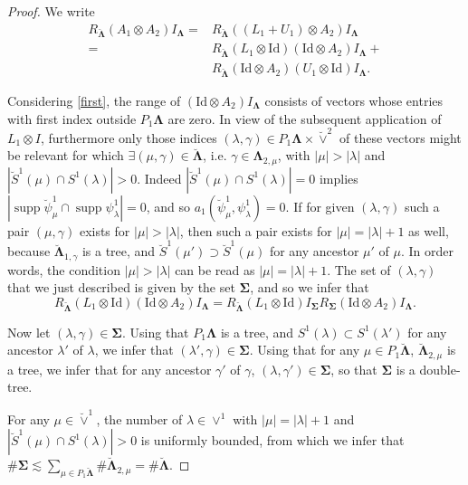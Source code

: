 \documentclass{amsart}
\theoremstyle{definition}
\theoremstyle{remark}
\numberwithin{equation}{section}
\DeclareMathOperator{\supp}{supp}
\newcommand{\1}{\mathbb 1}
\begin{document}
\begin{proof}We write
\begin{align} \nonumber
R_{\bm{\breve{\Lambda}}} (A_1 \otimes A_2) I_{\bm{\Lambda}}=&R_{\bm{\breve{\Lambda}}} ((L_1+U_1) \otimes A_2) I_{\bm{\Lambda}}\\ 
\label{first}
=&R_{\bm{\breve{\Lambda}}} (L_1\otimes \mathrm{Id})(\mathrm{Id} \otimes A_2) I_{\bm{\Lambda}}+
\\ 
\label{second}
&R_{\bm{\breve{\Lambda}}} (\mathrm{Id} \otimes A_2) (U_1 \otimes \mathrm{Id}) I_{\bm{\Lambda}}.
\end{align}

Considering \eqref{first}, the range of $(\mathrm{Id} \otimes A_2) I_{\bm{\Lambda}}$ consists of vectors whose entries with first index outside $P_1\bm{\Lambda}$ are zero.
In view of the subsequent application of $L_1 \otimes I$, furthermore only those indices $(\lambda,\gamma) \in P_1\bm{\Lambda} \times \breve{\vee}^2$ of these vectors might be relevant for which $\exists (\mu,\gamma) \in \bm{\breve{\Lambda}}$, i.e. $\gamma \in \bm{\Lambda}_{2,\mu}$, with $|\mu|>|\lambda|$ and $|\breve{S}^1(\mu) \cap S^1(\lambda)|>0$.
Indeed $|\breve{S}^1(\mu) \cap S^1(\lambda)|=0$ implies
$|\supp \breve{\psi}^1_\mu \cap \supp \psi^1_\lambda|=0$, and so $a_1(\breve{\psi}^1_\mu,\psi^1_\lambda)=0$. 
If for given $(\lambda,\gamma)$ such a pair $(\mu,\gamma)$ exists for  $|\mu|>|\lambda|$, then such a pair exists for $|\mu|=|\lambda|+1$ as well, because $\bm{\breve{\Lambda}}_{1,\gamma}$ is a tree, and $\breve{S}^1(\mu') \supset \breve{S}^1(\mu)$ for any ancestor $\mu'$ of $\mu$.
In order words, the condition $|\mu|>|\lambda|$ can be read as $|\mu|=|\lambda|+1$. The set of $(\lambda,\gamma)$ that we just described is given by the set $\bm{\Sigma}$, and so we infer that
$$
R_{\bm{\breve{\Lambda}}} (L_1\otimes \mathrm{Id})(\mathrm{Id} \otimes A_2) I_{\bm{\Lambda}}=R_{\bm{\breve{\Lambda}}} (L_1\otimes \mathrm{Id})I_{\bm{\Sigma}}  R_{\bm{\Sigma}}(\mathrm{Id} \otimes A_2) I_{\bm{\Lambda}}.
$$

Now let $(\lambda,\gamma) \in \bm{\Sigma}$. Using that $P_1\bm{\Lambda}$ is a tree, and $S^1(\lambda) \subset S^1(\lambda')$ for any ancestor $\lambda'$ of $\lambda$, we infer that $(\lambda',\gamma) \in \bm{\Sigma}$. Using that for any $\mu \in P_1 \bm{\breve{\Lambda}}$, $\bm{\breve{\Lambda}}_{2,\mu}$ is a tree, we infer that for any ancestor $\gamma'$ of $\gamma$, $(\lambda,\gamma') \in \bm{\Sigma}$, so that $\bm{\Sigma}$ is a double-tree.

For any $\mu \in \breve{\vee}^1$, the number of $\lambda \in \vee^1$ with $|\mu|=|\lambda|+1$ and $|\breve{S}^1(\mu) \cap S^1(\lambda)|>0$ is uniformly bounded, 
from which we infer that $\# \bm{\Sigma} \lesssim \sum_{\mu \in P_1 \bm{\breve{\Lambda}}} \#\bm{\breve{\Lambda}}_{2,\mu}=\#\bm{\breve{\Lambda}}$.


\end{proof}
\end{document}

